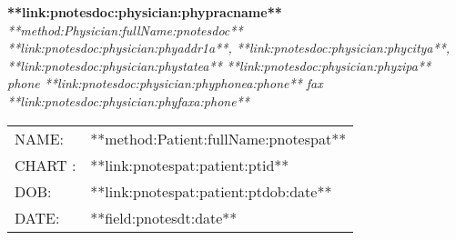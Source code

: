 \documentclass{article}
\begin{document}
\begin{center}        
	{\textbf{**link:pnotesdoc:physician:phypracname**}} \\
	{\textsl{**method:Physician:fullName:pnotesdoc**}} \\
        \textsl{**link:pnotesdoc:physician:phyaddr1a**, **link:pnotesdoc:physician:phycitya**, **link:pnotesdoc:physician:phystatea** **link:pnotesdoc:physician:phyzipa** } \\
        \textsl{phone **link:pnotesdoc:physician:phyphonea:phone** fax **link:pnotesdoc:physician:phyfaxa:phone**}
\end{center}

\begin{tabular}{ll}
	NAME:	&	**method:Patient:fullName:pnotespat**	\\
	CHART  :&	**link:pnotespat:patient:ptid** 	\\
	DOB:	&	**link:pnotespat:patient:ptdob:date**	\\
	DATE:	&	**field:pnotesdt:date**
\end{tabular}
\end{document}
